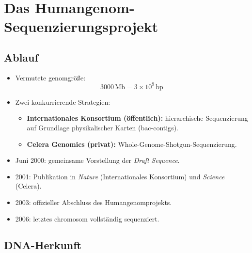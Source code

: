


\section{Das Humangenom-Sequenzierungsprojekt}\label{sec:das-humangenom-sequenzierungsprojekt}

\subsection*{Ablauf}\label{subsec:ablauf2}

\begin{itemize}
    \item Vermutete \gls{genom}größe:
    \[
        3000\,\mathrm{Mb} = 3 \times 10^{9}\,\mathrm{bp}
    \]

    \item Zwei konkurrierende Strategien:
    \begin{itemize}
        \item \textbf{Internationales Konsortium (öffentlich):}
        hierarchische Sequenzierung auf Grundlage physikalischer Karten
        (\gls{bac}-\gls{contig}s).

        \item \textbf{Celera Genomics (privat):}
        Whole-Genome-Shotgun-Sequenzierung.
    \end{itemize}

    \item Juni 2000:
    gemeinsame Vorstellung der \emph{Draft Sequence}.

    \item 2001:
    Publikation in
    \emph{Nature} (Internationales Konsortium)
    und
    \emph{Science} (Celera).

    \item 2003:
    offizieller Abschluss des Humangenomprojekts.

    \item 2006:
    letztes \gls{chromosom} vollständig sequenziert.
\end{itemize}

\subsection*{DNA-Herkunft}\label{subsec:dna-herkunft}

